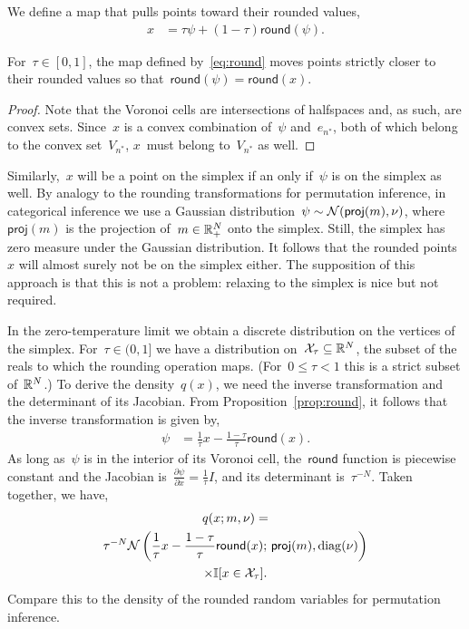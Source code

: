 We define a map that pulls points toward their rounded values,
\begin{align}
  \label{eq:round}
  x &=  \tau \psi + (1-\tau) \mathsf{round}(\psi).
\end{align}

\begin{proposition}
  \label{prop:round}
  For~${\tau \in [0,1]}$, the map defined by~\eqref{eq:round} moves
  points strictly closer to their rounded values so
  that~$\mathsf{round}(\psi) = \mathsf{round}(x)$.
\end{proposition}

\begin{proof}
Note that the Voronoi cells are intersections of halfspaces and, as
such, are convex sets.  Since~$x$ is a convex combination of~$\psi$
and~$e_{n^*}$, both of which belong to the convex set~$V_{n^*}$,
$x$~must belong to~$V_{n^*}$ as well.
\end{proof}

Similarly,~$x$ will be a point on the simplex if an only if~$\psi$ is
on the simplex as well.  By analogy to the rounding transformations
for permutation inference, in categorical inference we use a Gaussian
distribution~${\psi \sim \mathcal{N}(\mathsf{proj}(m), \nu)}$,
where~$\mathsf{proj}(m)$ is the projection of~$m \in \mathbb{R}_+^N$ onto
the simplex.  Still, the simplex has zero measure under the Gaussian
distribution.  It follows that the rounded points~$x$ will almost
surely not be on the simplex either.  The supposition of this approach
is that this is not a problem: relaxing to the simplex is nice but not
required.

In the zero-temperature limit we obtain a discrete distribution on the
vertices of the simplex.  For~${\tau \in (0,1]}$ we have a
distribution on~${\mathcal{X}_\tau \subseteq \mathbb{R}^N}$, the subset of the
reals to which the rounding operation maps. (For~${0 \leq \tau < 1}$
this is a strict subset of~$\mathbb{R}^N$.) To derive the
density~$q(x)$, we need the inverse transformation and the
determinant of its Jacobian.  From Proposition~\ref{prop:round}, it
follows that the inverse transformation is given by,
\begin{align*}
  \psi &= \frac{1}{\tau} x - \frac{1 - \tau}{\tau} \mathsf{round}(x).
\end{align*}
As long as~$\psi$ is in the interior of its Voronoi cell,
the~$\mathsf{round}$ function is piecewise constant and the
Jacobian is~${\tfrac{\partial\psi}{\partial x} = \tfrac{1}{\tau} I}$,
and its determinant is~$\tau^{-N}$. Taken together, we have,
\begin{multline*}
  q(x; m, \nu) =  \\
  \tau^{-N} \mathcal{N} \left(\frac{1}{\tau}x - \frac{1-\tau}{\tau} \mathsf{round}(x); \, \mathsf{proj}(m), \operatorname{diag}(\nu) \right) \\
  \times \mathbb{I}[x \in \mathcal{X}_\tau].
\end{multline*}
Compare this to the density of the rounded random variables for
permutation inference. 

